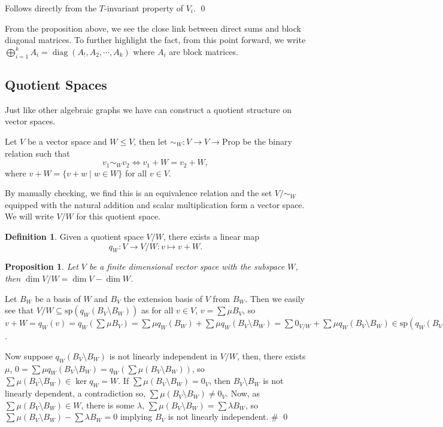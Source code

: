 \documentclass[
]{article}
\newtheorem{prop}{Proposition}[section]
\theoremstyle{definition}
\newtheorem{definition}{Definition}[section]
\begin{document}
Follows directly from the \(T\)-invariant property of \(V_i\). \qed

From the proposition above, we see the close link between direct sums
and block diagonal matrices. To further highlight the fact, from this
point forward, we write
\(\bigoplus_{i = 1}^k A_i = \mathop{\mathrm{diag}}(A_!, A_2, \cdots, A_k)\)
where \(A_i\) are block matrices.

\hypertarget{quotient-spaces}{%
\subsection{Quotient Spaces}\label{quotient-spaces}}

Just like other algebraic graphs we have can construct a quotient
structure on vector spaces.

Let \(V\) be a vector space and \(W \le V\), then let
\(\sim_W : V \to V \to \text{Prop}\) be the binary relation such that
\[v_1 \sim_W v_2 \iff v_1 + W = v_2 + W,\] where
\(v + W = \{v + w \mid w \in W\}\) for all \(v \in V\).

By manually checking, we find this is an equivalence relation and the
set \(V / \sim_W\) equipped with the natural addition and scalar
multiplication form a vector space. We will write \(V / W\) for this
quotient space.

\begin{definition}
  Given a quotient space \(V / W\), there exists a linear map
  \[q_W : V \to V / W : v \mapsto v + W.\]
\end{definition}

\begin{prop}\label{dim_sub}
  Let \(V\) be a finite dimensional vector space with the subspace \(W\), 
  then \(\dim V / W = \dim V - \dim W\).
\end{prop}
\proof

Let \(B_W\) be a basis of \(W\) and \(B_V\) the extension basis of \(V\)
from \(B_W\). Then we easily see that
\(V / W \subseteq \text{sp}(q_W(B_V \setminus B_W))\) as for all
\(v \in V\), \(v = \sum \mu B_V\), so
\(v + W = q_W(v) = q_W(\sum \mu B_V) =  \sum \mu q_W(B_W) + \sum \mu q_W(B_V \setminus B_W) = \sum 0_{V / W} +  \sum \mu q_W(B_V \setminus B_W) \in \text{sp}(q_W(B_V \setminus B_W))\).

Now suppose \(q_W(B_V \setminus B_W)\) is not linearly independent in
\(V / W\), then, there exists \(\mu\),
\(0 = \sum \mu q_W(B_V \setminus B_W) =  q_W (\sum \mu (B_V \setminus B_W))\),
so \(\sum \mu (B_V \setminus B_W) \in  \ker q_W = W\). If
\(\sum \mu (B_V \setminus B_W) = 0_V\), then \(B_V \setminus B_W\) is
not linearly dependent, a contradiction so,
\(\sum \mu (B_V \setminus B_W) \neq 0_V\). Now, as
\(\sum \mu (B_V \setminus B_W) \in W\), there is some \(\lambda\),
\(\sum \mu (B_V \setminus B_W) = \sum \lambda B_W\), so
\(\sum \mu (B_V \setminus B_W) - \sum \lambda B_W = 0\) implying \(B_V\)
is not linearly independent. \# \qed
\end{document}
